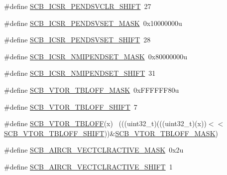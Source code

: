 \begin{DoxyCompactItemize}
\item 
\#define \hyperlink{group___s_c_b___register___masks_gad7a5894ad98606b443ab6f1b52f2bc36}{S\+C\+B\+\_\+\+I\+C\+S\+R\+\_\+\+P\+E\+N\+D\+S\+V\+C\+L\+R\+\_\+\+S\+H\+I\+FT}~27
\item 
\#define \hyperlink{group___s_c_b___register___masks_ga5ed59a5d03a7d25ef76aa9d92e25e4a5}{S\+C\+B\+\_\+\+I\+C\+S\+R\+\_\+\+P\+E\+N\+D\+S\+V\+S\+E\+T\+\_\+\+M\+A\+SK}~0x10000000u
\item 
\#define \hyperlink{group___s_c_b___register___masks_ga76cddcbf872958b00237c662309251d2}{S\+C\+B\+\_\+\+I\+C\+S\+R\+\_\+\+P\+E\+N\+D\+S\+V\+S\+E\+T\+\_\+\+S\+H\+I\+FT}~28
\item 
\#define \hyperlink{group___s_c_b___register___masks_gab2a6cb5708895a81ec8826b8fa546145}{S\+C\+B\+\_\+\+I\+C\+S\+R\+\_\+\+N\+M\+I\+P\+E\+N\+D\+S\+E\+T\+\_\+\+M\+A\+SK}~0x80000000u
\item 
\#define \hyperlink{group___s_c_b___register___masks_ga8a185fc794df7e755e5f3a8b3a06d042}{S\+C\+B\+\_\+\+I\+C\+S\+R\+\_\+\+N\+M\+I\+P\+E\+N\+D\+S\+E\+T\+\_\+\+S\+H\+I\+FT}~31
\item 
\#define \hyperlink{group___s_c_b___register___masks_ga07fd57e90baff628af14394c8142dc27}{S\+C\+B\+\_\+\+V\+T\+O\+R\+\_\+\+T\+B\+L\+O\+F\+F\+\_\+\+M\+A\+SK}~0x\+F\+F\+F\+F\+F\+F80u
\item 
\#define \hyperlink{group___s_c_b___register___masks_gac6092f3c78a9f126c2d02740a7976708}{S\+C\+B\+\_\+\+V\+T\+O\+R\+\_\+\+T\+B\+L\+O\+F\+F\+\_\+\+S\+H\+I\+FT}~7
\item 
\#define \hyperlink{group___s_c_b___register___masks_ga0fc8974ae1755bc9819c97712403b828}{S\+C\+B\+\_\+\+V\+T\+O\+R\+\_\+\+T\+B\+L\+O\+FF}(x)                                          ~(((uint32\+\_\+t)(((uint32\+\_\+t)(x))$<$$<$\hyperlink{group___s_c_b___register___masks_gac6092f3c78a9f126c2d02740a7976708}{S\+C\+B\+\_\+\+V\+T\+O\+R\+\_\+\+T\+B\+L\+O\+F\+F\+\_\+\+S\+H\+I\+FT}))\&\hyperlink{group___s_c_b___register___masks_ga07fd57e90baff628af14394c8142dc27}{S\+C\+B\+\_\+\+V\+T\+O\+R\+\_\+\+T\+B\+L\+O\+F\+F\+\_\+\+M\+A\+SK})
\item 
\#define \hyperlink{group___s_c_b___register___masks_ga185d1b709217248a97734877cf639eac}{S\+C\+B\+\_\+\+A\+I\+R\+C\+R\+\_\+\+V\+E\+C\+T\+C\+L\+R\+A\+C\+T\+I\+V\+E\+\_\+\+M\+A\+SK}~0x2u
\item 
\#define \hyperlink{group___s_c_b___register___masks_gacc6a889c36f0c9d996ab29dc076eec6e}{S\+C\+B\+\_\+\+A\+I\+R\+C\+R\+\_\+\+V\+E\+C\+T\+C\+L\+R\+A\+C\+T\+I\+V\+E\+\_\+\+S\+H\+I\+FT}~1
\item 
$$
\end{DoxyCompactItemize}
